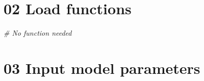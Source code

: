 \documentclass[
]{article}
\newenvironment{Shaded}{\begin{snugshade}}{\end{snugshade}}
\newcommand{\CommentTok}[1]{\textcolor[rgb]{0.56,0.35,0.01}{\textit{#1}}}
\begin{document}
\hypertarget{load-functions}{%
\section{02 Load functions}\label{load-functions}}

\begin{Shaded}
\begin{Highlighting}[]
\CommentTok{# No function needed}
\end{Highlighting}
\end{Shaded}

\hypertarget{input-model-parameters}{%
\section{03 Input model parameters}\label{input-model-parameters}}
\end{document}
